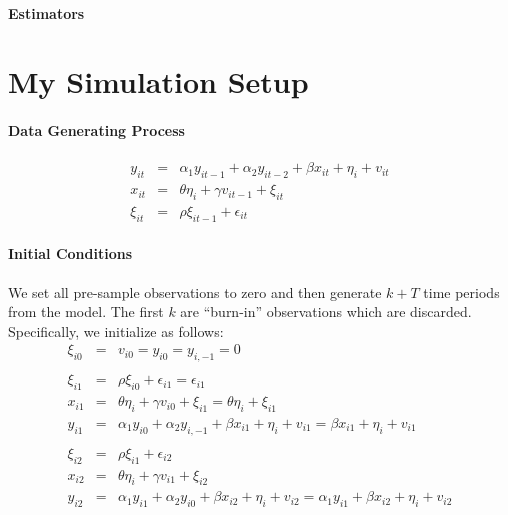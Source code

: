 \documentclass[12pt]{article}
\begin{document}
\paragraph{Estimators}


\section{My Simulation Setup}

\paragraph{Data Generating Process} 
\begin{eqnarray*}
y_{it} &=& \alpha_1 y_{it-1} + \alpha_2 y_{it-2} +\beta   x_{it} + \eta_i + v_{it}\\
x_{it} &=& \theta \eta_i + \gamma v_{it-1} + \xi_{it}\\
\xi_{it} &=& \rho \xi_{it-1} + \epsilon_{it}
\end{eqnarray*}

\paragraph{Initial Conditions} We set all pre-sample observations to zero and then generate $k + T$ time periods from the model. The first $k$ are ``burn-in'' observations which are discarded. Specifically, we initialize as follows:
  \begin{eqnarray*}
    \xi_{i0} &=& v_{i0} = y_{i0} = y_{i,-1} = 0\\ \\
    \xi_{i1} &=& \rho \xi_{i0} + \epsilon_{i1} = \epsilon_{i1}\\
    x_{i1} &=& \theta \eta_i + \gamma v_{i0} + \xi_{i1} = \theta \eta_i + \xi_{i1} \\
    y_{i1} &=& \alpha_1 y_{i0} + \alpha_2 y_{i,-1} + \beta x_{i1} + \eta_i + v_{i1} = \beta x_{i1} + \eta_i + v_{i1}  \\ \\
    \xi_{i2} &=& \rho \xi_{i1} + \epsilon_{i2} \\
    x_{i2} &=& \theta \eta_i + \gamma v_{i1} + \xi_{i2}\\
    y_{i2} &=& \alpha_1 y_{i1} + \alpha_2 y_{i0} + \beta x_{i2} + \eta_i + v_{i2} = \alpha_1 y_{i1} + \beta x_{i2} + \eta_i + v_{i2} 
  \end{eqnarray*}
\end{document}
